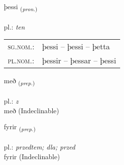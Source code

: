\documentclass[frontgrid, backgrid]{flacards}\usepackage[]{graphicx}\usepackage[]{xcolor}
\begin{document}
{þessi \small{\textsubscript{(\textit{pron.})}} \\[1ex] %
\textphonetic{[θɛsɪ]} \\
pl.: \emph{ten} \\  [2ex]
\renewcommand*{\arraystretch}{0.8}
\begin{tabular}{ll}
\textsc{sg.nom.}: & þessi  --  þessi -- þetta \\ 
\textsc{pl.nom.}: & þessir -- þessar -- þessi
\end{tabular}
}


\renewcommand{\flhead}{\vskip5pt \fboxsep=0pt {\small\bfseries\footnotesize Forsetning | Preposition}}
\renewcommand{\fcfoot}{\vskip5pt \fboxsep=0pt \hspace{2pt}{\small\bfseries\footnotesize 1K}}

\renewcommand{\blhead}{\vskip5pt {\small\bfseries\footnotesize Forsetning | Preposition }}
\renewcommand{\bcfoot}{\vskip5pt \hspace{2pt}{\small\bfseries\footnotesize 1K}}


{með \small{\textsubscript{(\textit{prep.})}} \\[1ex]
\textphonetic{[mɛːð]} \\
pl.: \emph{z} \\  [2ex]
með (Indeclinable)}


\renewcommand{\flhead}{\vskip5pt \fboxsep=0pt {\small\bfseries\footnotesize Forsetning | Preposition}}
\renewcommand{\fcfoot}{\vskip5pt \fboxsep=0pt \hspace{2pt}{\small\bfseries\footnotesize 1K}}

\renewcommand{\blhead}{\vskip5pt {\small\bfseries\footnotesize Forsetning | Preposition }}
\renewcommand{\bcfoot}{\vskip5pt \hspace{2pt}{\small\bfseries\footnotesize 1K}}


{fyrir \small{\textsubscript{(\textit{prep.})}} \\[1ex]
\textphonetic{[fɪːrɪr]} \\
pl.: \emph{przedtem; dla; przed} \\  [2ex]
fyrir (Indeclinable)}
\end{document}
